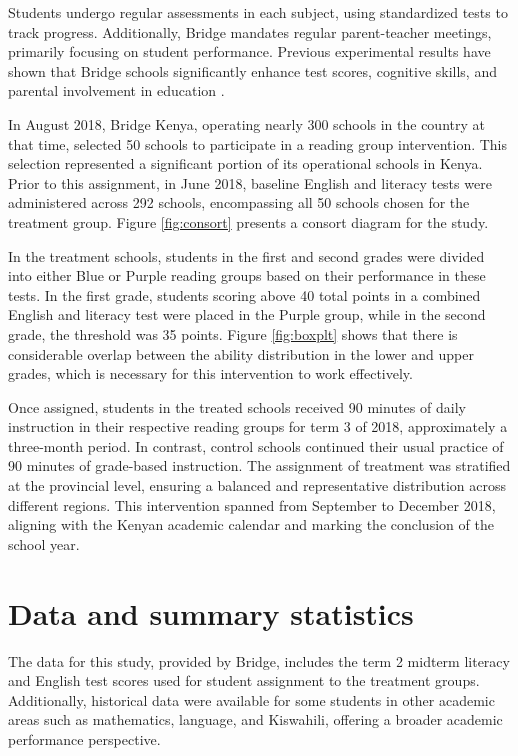 \documentclass[12pt]{article}
\begin{document}
Students undergo regular assessments in each subject, using standardized tests to track progress. Additionally, Bridge mandates regular parent-teacher meetings, primarily focusing on student performance. Previous experimental results have shown that Bridge schools significantly enhance test scores, cognitive skills, and parental involvement in education \citep{gray2022can}.

In August 2018, Bridge Kenya, operating nearly 300 schools in the country at that time, selected 50 schools to participate in a reading group intervention. This selection represented a significant portion of its operational schools in Kenya. Prior to this assignment, in June 2018, baseline English and literacy tests were administered across 292 schools, encompassing all 50 schools chosen for the treatment group. Figure \ref{fig:consort} presents a consort diagram for the study.
 
In the treatment schools, students in the first and second grades were divided into either Blue or Purple reading groups based on their performance in these tests. In the first grade, students scoring above 40 total points in a combined English and literacy test were placed in the Purple group, while in the second grade, the threshold was 35 points. Figure \ref{fig:boxplt} shows that there is considerable overlap between the ability distribution in the lower and upper grades, which is necessary for this intervention to work effectively. 

Once assigned, students in the treated schools received 90 minutes of daily instruction in their respective reading groups for term 3 of 2018, approximately a three-month period. In contrast, control schools continued their usual practice of 90 minutes of grade-based instruction. The assignment of treatment was stratified at the provincial level, ensuring a balanced and representative distribution across different regions. This intervention spanned from September to December 2018, aligning with the Kenyan academic calendar and marking the conclusion of the school year.

\section{Data and summary statistics}
\label{sec:data}

The data for this study, provided by Bridge, includes the term 2 midterm literacy and English test scores used for student assignment to the treatment groups. Additionally, historical data were available for some students in other academic areas such as mathematics, language, and Kiswahili, offering a broader academic performance perspective.
\end{document}
